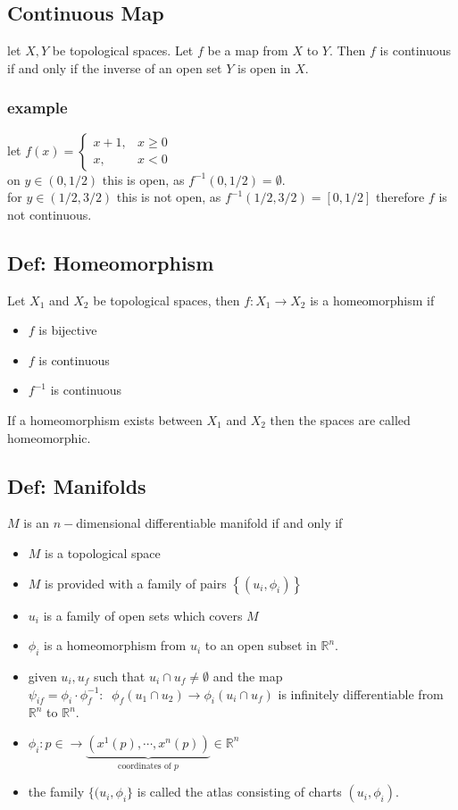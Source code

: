 \subsection{Continuous Map}
let $X,Y$ be topological spaces. Let $f$ be a map from $X$ to $Y$. Then $f$ is continuous if and only if the inverse of an open set $Y$ is open in $X$.

\subsubsection*{example}
let $f(x) = \begin{cases}
	x+1, & x\geq 0\\
	x, & x<0
\end{cases}$\\
on $y\in(0,1/2)$ this is open, as $f^{-1}(0,1/2) = \emptyset$.\\
for $y\in(1/2,3/2)$ this is not open, as $f^{-1}(1/2,3/2) = [0,1/2]$ therefore $f$ is not continuous.
\subsection{Def: Homeomorphism}
Let $X_1$ and $X_2$ be topological spaces, then $f:X_1\rightarrow X_2$ is a homeomorphism if
\begin{itemize}
	\item $f$ is bijective
	\item $f$ is continuous
	\item $f^{-1}$ is continuous
\end{itemize}
If a homeomorphism exists between $X_1$ and $X_2$ then the spaces are called homeomorphic.

\subsection{Def: Manifolds}
$M$ is an $n-$dimensional differentiable manifold if and only if 
\begin{itemize}
	\item $M$ is a topological space
	\item $M$ is provided with a family of pairs $\left\{(u_i,\phi_i)\right\}$
	\item $u_i$ is a family of open sets which covers $M$
	\item $\phi_i$ is a homeomorphism from $u_i$ to an open subset in $\mathbb R^n$.
	\item given $u_i, u_f$ such that $u_i\cap u_f \neq \emptyset$ and the map $\psi_{if} = \phi_i \cdot \phi^{-1}_f:\;\; \phi_f(u_1\cap u_2)\rightarrow \phi_i(u_i\cap u_f)$ is infinitely differentiable from $\mathbb R^n$ to $\mathbb R^n$.
	\item $\phi_i: p\in\mathbb \rightarrow \underbrace{(x^1(p), \cdots, x^n(p))}_{\text{coordinates of $p$}}\in\mathbb R^n$
	\item the family $\{(u_i,\phi_i\}$ is called the atlas consisting of charts $(u_i,\phi_i)$.
\end{itemize}

